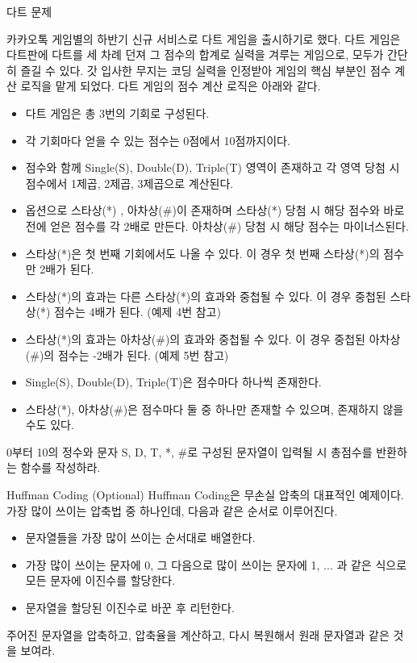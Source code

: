 \documentclass{beamer}
\begin{document}
\begin{frame}[allowframebreaks]{다트 문제} 

카카오톡 게임별의 하반기 신규 서비스로 다트 게임을 출시하기로 했다. 다트 게임은 다트판에 다트를 세 차례 던져 그 점수의 합계로 실력을 겨루는 게임으로, 모두가 간단히 즐길 수 있다.
갓 입사한 무지는 코딩 실력을 인정받아 게임의 핵심 부분인 점수 계산 로직을 맡게 되었다. 다트 게임의 점수 계산 로직은 아래와 같다.
\begin{itemize}
\item 다트 게임은 총 3번의 기회로 구성된다.
\item 각 기회마다 얻을 수 있는 점수는 0점에서 10점까지이다.
\item 점수와 함께 Single(S), Double(D), Triple(T) 영역이 존재하고 각 영역 당첨 시 점수에서 1제곱, 2제곱, 3제곱으로 계산된다.
\item 옵션으로 스타상(*) , 아차상(\#)이 존재하며 스타상(*) 당첨 시 해당 점수와 바로 전에 얻은 점수를 각 2배로 만든다. 아차상(\#) 당첨 시 해당 점수는 마이너스된다.
\item 스타상(*)은 첫 번째 기회에서도 나올 수 있다. 이 경우 첫 번째 스타상(*)의 점수만 2배가 된다. 
\item 스타상(*)의 효과는 다른 스타상(*)의 효과와 중첩될 수 있다. 이 경우 중첩된 스타상(*) 점수는 4배가 된다. (예제 4번 참고)
\item 스타상(*)의 효과는 아차상(\#)의 효과와 중첩될 수 있다. 이 경우 중첩된 아차상(\#)의 점수는 -2배가 된다. (예제 5번 참고)
\item Single(S), Double(D), Triple(T)은 점수마다 하나씩 존재한다.
\item 스타상(*), 아차상(\#)은 점수마다 둘 중 하나만 존재할 수 있으며, 존재하지 않을 수도 있다.
\end{itemize}

0부터 10의 정수와 문자 S, D, T, *, \#로 구성된 문자열이 입력될 시 총점수를 반환하는 함수를 작성하라. 
\end{frame}


\begin{frame}{Huffman Coding (Optional)}
Huffman Coding은 무손실 압축의 대표적인 예제이다. 가장 많이 쓰이는 압축법 중 하나인데, 다음과 같은 순서로 이루어진다. 
\begin{itemize} 
\item 문자열들을 가장 많이 쓰이는 순서대로 배열한다. 
\item 가장 많이 쓰이는 문자에 0, 그 다음으로 많이 쓰이는 문자에 1, ... 과 같은 식으로 모든 문자에 이진수를 할당한다. 
\item 문자열을 할당된 이진수로 바꾼 후 리턴한다. 
\end{itemize}

주어진 문자열을 압축하고, 압축율을 계산하고, 다시 복원해서 원래 문자열과 같은 것을 보여라. 

\end{frame}
\end{document}
